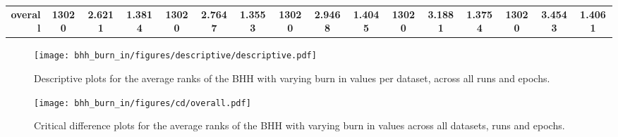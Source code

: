 \begin{table}[htbp]
{\begin{tabular}{rccccccccccccccc}
			\midrule
			\textbf{overall}                    & \textbf{13020}                       & \cellcolor[rgb]{ .776,  .937,  .808}\textcolor[rgb]{ 0,  .38,  0}{\textbf{2.6211}} & \textbf{1.3814} & \textbf{13020} & \textbf{2.7647}                                                           & \textbf{1.3553} & \textbf{13020} & \textbf{2.9468}                                                           & \textbf{1.4045} & \textbf{13020} & \textbf{3.1881}                                                           & \textbf{1.3754} & \textbf{13020} & \textbf{3.4543} & \textbf{1.4061} \\
		\end{tabular}%
	}
\end{table}%

\begin{figure}[htbp]
	\centering
	\texttt{[image: bhh\_burn\_in/figures/descriptive/descriptive.pdf]}
	\caption{Descriptive plots for the average ranks of the \acs{BHH} with varying burn in values per dataset, across all runs and epochs.}
	\label{fig:results:burn_in:descriptive:descriptive}
\end{figure}

\begin{figure}[htbp]
	\centering
	\texttt{[image: bhh\_burn\_in/figures/cd/overall.pdf]}
	\caption{Critical difference plots for the average ranks of the \acs{BHH} with varying burn in values across all datasets, runs and epochs.}
	\label{fig:results:burn_in:descriptive:cd}
\end{figure}

